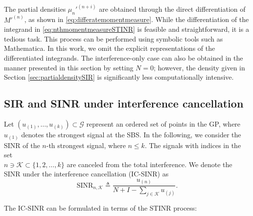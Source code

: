 \documentclass[lettersize,journal]{IEEEtran}
\begin{document}
The partial densities $\mu_{n}'^{(n+i)}$ are obtained through the direct differentiation of $M'^{(n)}$, as shown in \eqref{eq:differatemomentmeasure}. While the differentiation of the integrand in \eqref{eq:nthmomentmeasureSTINR} is feasible and straightforward, it is a tedious task. This process can be performed using symbolic tools such as Mathematica. In this work, we omit the explicit representations of the differentiated integrands. The interference-only case can also be obtained in the manner presented in this section by setting $N=0$; however, the density given in Section \ref{sec:partialdensitySIR} is significantly less computationally intensive.


\subsection{SIR and SINR under interference cancellation}




Let $(u_{(1)}, \dots, u_{(k)}) \subset \mathcal{G}$ represent an ordered set of points in the GP, where $u_{(1)}$ denotes the strongest signal at the SBS. In the following, we consider the SINR of the $n$-th strongest signal, where $n \leq k$. The signals with indices in the set \\$n \ni \mathcal{K} \subset \{1, 2, \dots, k\}$ are canceled from the total interference. We denote the SINR under the interference cancellation (IC-SINR) as
\begin{equation}
  \label{eq:IC-SINR}
  \text{SINR}_{n,\mathcal{K}} \triangleq \frac{u_{(n)}}{N+I-\sum_{j \in \mathcal{K} } u_{(j)}}.
\end{equation}


The IC-SINR can be formulated in terms of the STINR process:

\end{document}
